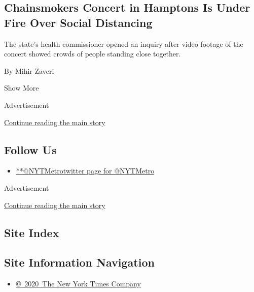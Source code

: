 \begin{enumerate}
  \hypertarget{chainsmokers-concert-in-hamptons-is-under-fire-over-social-distancing}{%
  \subsection{Chainsmokers Concert in Hamptons Is Under Fire Over Social
  Distancing}\label{chainsmokers-concert-in-hamptons-is-under-fire-over-social-distancing}}

  The state's health commissioner opened an inquiry after video footage
  of the concert showed crowds of people standing close together.

  By Mihir Zaveri
\end{enumerate}

Show More

Advertisement

\protect\hyperlink{after-mid2}{Continue reading the main story}

\hypertarget{follow-us}{%
\subsection{Follow Us}\label{follow-us}}

\begin{itemize}
\tightlist
\item
  \href{https://twitter.com/NYTMetro}{**@NYTMetrotwitter page for
  @NYTMetro}
\end{itemize}

Advertisement

\protect\hyperlink{after-mktg}{Continue reading the main story}

\hypertarget{site-index}{%
\subsection{Site Index}\label{site-index}}

\hypertarget{site-information-navigation}{%
\subsection{Site Information
Navigation}\label{site-information-navigation}}

\begin{itemize}
\tightlist
\item
  \href{https://help.nytimes3xbfgragh.onion/hc/en-us/articles/115014792127-Copyright-notice}{©~2020~The
  New York Times Company}
\end{itemize}

